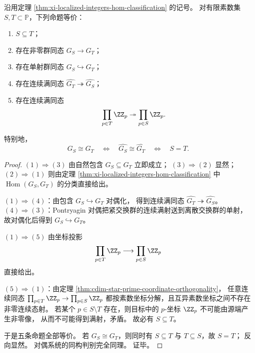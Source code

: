 \begin{corollary}\label{cor:xi-localized-integers-order-dual-quotient}
沿用定理 \ref{thm:xi-localized-integers-hom-classification} 的记号。
对有限素数集 \(S,T\subset\mathbb P\)，下列命题等价：
\begin{enumerate}
  \item \(S\subseteq T\)；
  \item 存在非零群同态 \(G_S\to G_T\)；
  \item 存在单射群同态 \(G_S\hookrightarrow G_T\)；
  \item 存在连续满同态 \(\widehat{G_T}\twoheadrightarrow \widehat{G_S}\)；
  \item 存在连续满同态
  \[
  \prod_{p\in T}\ZZ_p\twoheadrightarrow \prod_{p\in S}\ZZ_p.
  \]
\end{enumerate}
特别地，
\[
G_S\cong G_T
\quad\Longleftrightarrow\quad
\widehat{G_S}\cong \widehat{G_T}
\quad\Longleftrightarrow\quad
S=T.
\]
\end{corollary}
\begin{proof}
\((1)\Rightarrow(3)\) 由自然包含 \(G_S\subseteq G_T\) 立即成立；
\((3)\Rightarrow(2)\) 显然；
\((2)\Rightarrow(1)\) 则由定理
\ref{thm:xi-localized-integers-hom-classification} 中
\(\operatorname{Hom}(G_S,G_T)\) 的分类直接给出。
\par
\((1)\Rightarrow(4)\)：由包含 \(G_S\hookrightarrow G_T\) 对偶化，
得到连续满同态
\(
\widehat{G_T}\twoheadrightarrow\widehat{G_S}
\)。
\((4)\Rightarrow(3)\)：Pontryagin 对偶把紧交换群的连续满射送到离散交换群的单射，
故对偶化后得到 \(G_S\hookrightarrow G_T\)。
\par
\((1)\Rightarrow(5)\) 由坐标投影
\[
\prod_{p\in T}\ZZ_p\longrightarrow \prod_{p\in S}\ZZ_p
\]
直接给出。
\par
\((5)\Rightarrow(1)\)：由定理 \ref{thm:cdim-star-prime-coordinate-orthogonality}，
任意连续同态
\(
\prod_{p\in T}\ZZ_p\to\prod_{p\in S}\ZZ_p
\)
都按素数坐标分解，且互异素数坐标之间不存在非零连续态射。
若某个 \(p\in S\setminus T\) 存在，则目标中的 \(p\)-坐标 \(\ZZ_p\) 不可能由源端产生非零像，
从而不可能得到满射，矛盾。
故必有 \(S\subseteq T\)。
\par
于是五条命题全部等价。
若 \(G_S\cong G_T\)，则同时有 \(S\subseteq T\) 与 \(T\subseteq S\)，故 \(S=T\)；
反向显然。
对偶系统的同构判别完全同理。
证毕。
\end{proof}

